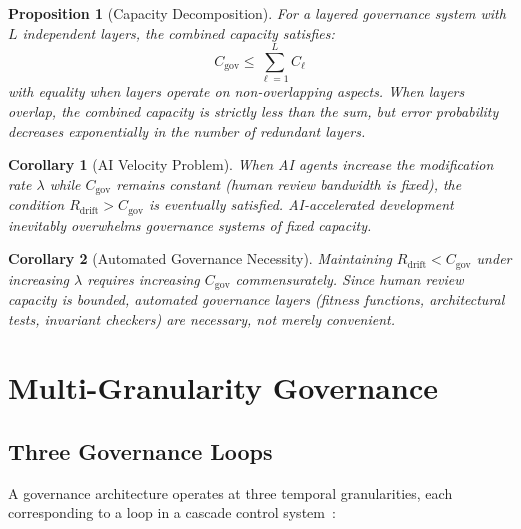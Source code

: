 \documentclass[11pt, a4paper, copyright]{googledeepmind}
\newtheorem{proposition}{Proposition}[section]
\newtheorem{corollary}{Corollary}[section]
\begin{document}
\begin{proposition}[Capacity Decomposition]
\label{prop:decomp}
For a layered governance system with $L$ independent layers, the combined capacity satisfies:
\begin{equation}
    C_{\mathrm{gov}} \leq \sum_{\ell=1}^{L} C_\ell
\end{equation}
with equality when layers operate on non-overlapping aspects. When layers overlap, the combined capacity is strictly less than the sum, but error probability decreases exponentially in the number of redundant layers.
\end{proposition}

\begin{corollary}[AI Velocity Problem]
\label{cor:velocity}
When AI agents increase the modification rate $\lambda$ while $C_{\mathrm{gov}}$ remains constant (human review bandwidth is fixed), the condition $R_{\mathrm{drift}} > C_{\mathrm{gov}}$ is eventually satisfied. AI-accelerated development inevitably overwhelms governance systems of fixed capacity.
\end{corollary}

\begin{corollary}[Automated Governance Necessity]
Maintaining $R_{\mathrm{drift}} < C_{\mathrm{gov}}$ under increasing $\lambda$ requires increasing $C_{\mathrm{gov}}$ commensurately. Since human review capacity is bounded, automated governance layers (fitness functions, architectural tests, invariant checkers) are \emph{necessary}, not merely convenient.
\end{corollary}


\section{Multi-Granularity Governance}
\label{sec:control}

\subsection{Three Governance Loops}

A governance architecture operates at three temporal granularities, each corresponding to a loop in a cascade control system~\citep{seborg2004, hellerstein2004}:
\end{document}
